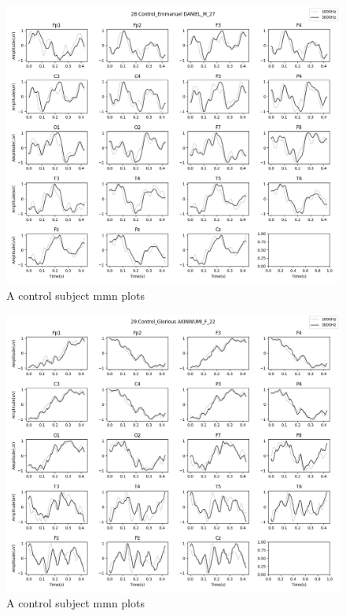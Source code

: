 \documentclass[10pt]{article}
\begin{document}
\begin{figure}[H]
  \includegraphics[width=16cm]{../../../data_analysis_results/MMN/time_series/Control/28.png}
  \caption{A control subject \gls{mmn} plots}
\end{figure}
\begin{figure}[H]
  \includegraphics[width=16cm]{../../../data_analysis_results/MMN/time_series/Control/29.png}
  \caption{A control subject \gls{mmn} plots}
\end{figure}
\end{document}

